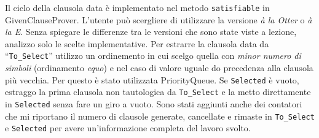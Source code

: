 \documentclass[a4paper,11pt]{article} %
\newcommand{\classe}{\textsf}
\newcommand{\metodo}{\texttt}
\newcommand{\campo}{\texttt}
\begin{document}
Il ciclo della clausola data %
è implementato nel metodo \metodo{satisfiable} in
\classe{GivenClauseProver}. %
L'utente può scergliere di utilizzare la versione \emph{à la Otter} o \emph{à la E}.
Senza spiegare le differenze tra le versioni che sono state viste
a lezione, analizzo solo le scelte implementative.
Per estrarre la clausola data da ``\campo{To\_Select}'' utilizzo un ordinemento
in cui scelgo quella con \emph{minor numero
di simboli} (ordinamento \emph{equo}) 
e nel caso di valore uguale
do precedenza alla clausola più vecchia. 
Per questo è stato utilizzata \classe{PriorityQueue}.
Se \campo{Selected} è vuoto,
estraggo la prima clausola non tautologica da \campo{To\_Select} e la metto 
direttamente in \campo{Selected} senza fare un giro a vuoto.
%
%
Sono stati aggiunti anche dei contatori che mi riportano il numero di clausole
generate, cancellate e rimaste in
\campo{To\_Select} e \campo{Selected} per avere un'informazione completa del lavoro 
svolto.

\end{document}
